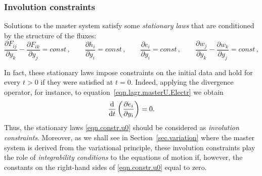 \documentclass[twoside]{article}
\newcommand{\pp}{{\boldsymbol{p}}}
\newcommand{\pd}{\partial}
\newcommand{\rmd}{{\rm d}}
\newcommand{\IP}[1]{ \textcolor{blue}   {\small\texttt{
\texttt{[image: pin\_small.jpeg]} Ilya: #1}} }
\newcommand{\MP}[1]{ \textcolor{Green}   {\small\texttt{
\texttt{[image: pin\_small.jpeg]} Michal: #1}} }
\begin{document}



\subsubsection{Involution constraints}
Solutions to the master system satisfy some \textit{stationary laws} that are 
conditioned by the structure of the fluxes:
\begin{equation}\label{eqn.constr.u0}
\dfrac{\pd F_{ij}}{\pd y_k}-\dfrac{\pd F_{ik}}{\pd y_j} = 
const\,, \qquad \dfrac{\pd h_i}{\pd y_i}= 
const\,,\qquad 
\dfrac{\pd e_i}{\pd y_i} = const\,, 
\qquad \dfrac{\pd w_{j}}{\pd y_k}-\dfrac{\pd w_{k}}{\pd 
y_j} = const\,,
\end{equation}

In fact, these stationary laws impose constraints on the initial data and hold 
for every $ t>0 $ if they were satisfied at $ t=0 $. Indeed, applying the 
divergence operator, for instance, to equation~\eqref{eqn.lagr.masterU.Electr} 
we 
obtain 
\begin{equation}
\frac{\rmd}{\rmd t }\left(\frac{\pd e_i}{\pd y_i}\right) = 0.
\end{equation}
Thus, the stationary laws \eqref{eqn.constr.u0} should be considered as 
\textit{involution 
constraints}. Moreover, as we shall see in Section~\ref{sec.variation} where 
the master 
system is derived from the variational principle, these involution constraints 
play the role of \textit{integrability conditions} to the equations of motion 
if, however, the constants on the right-hand sides of \eqref{eqn.constr.u0} 
equal to zero.
\end{document}
